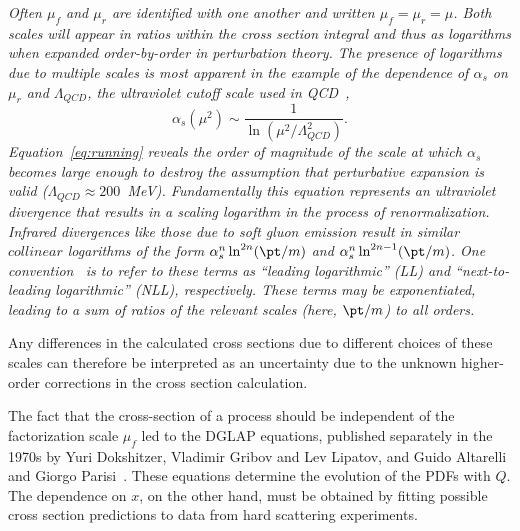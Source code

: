 {\it Often $\mu_f$ and $\mu_r$ are identified with one another and written $\mu_f = \mu_r = \mu$. Both scales will appear in ratios within the cross section integral and thus as logarithms when expanded order-by-order in perturbation theory. The presence of logarithms due to multiple scales is most apparent in the example of the dependence of $\alpha_s$ on $\mu_r$ and $\Lambda_{QCD}$, the ultraviolet cutoff scale used in QCD~\cite{LambdaQCD},} %
%
%
\begin{equation}
\alpha_s(\mu^2) \sim  \frac{1}{\ln(\mu^2/\Lambda^2_{QCD})}.
 \label{eq:running}
\end{equation}
%
{\it Equation~\ref{eq:running} reveals the order of magnitude of the scale at which $\alpha_s$ becomes large enough to destroy the assumption that perturbative expansion is valid ($\Lambda_{QCD} \approx 200$~MeV).  Fundamentally this equation represents an ultraviolet divergence that results in a scaling logarithm in the process of renormalization. Infrared divergences like those due to soft gluon emission result in similar $collinear$ logarithms of the form $\alpha^n_s \ln^{2n}(\pt / m)$ and $\alpha^n_s \ln^{2n-1}(\pt / m)$.  One convention~\cite{0954-3899-30-5-R01} is to refer to these terms as ``leading logarithmic'' (LL) and ``next-to-leading logarithmic'' (NLL), respectively. These terms may be exponentiated, leading to a sum of ratios of the relevant scales (here, $\pt / m$) to all orders.} %


Any differences in the calculated cross  sections due to different choices of these scales can therefore be interpreted as an uncertainty due to the unknown higher-order corrections in the cross section calculation.

The fact that the cross-section of a process should be independent of the factorization scale $\mu_f$  led to the  DGLAP equations, published separately in the 1970s by Yuri Dokshitzer, Vladimir Gribov and Lev Lipatov, and Guido Altarelli and Giorgo Parisi~\cite{Altarelli1977298}. These equations determine the evolution of the PDFs with $Q$. %
The dependence on $x$, on the other hand, must be obtained by fitting possible cross section predictions to data from hard scattering experiments.




